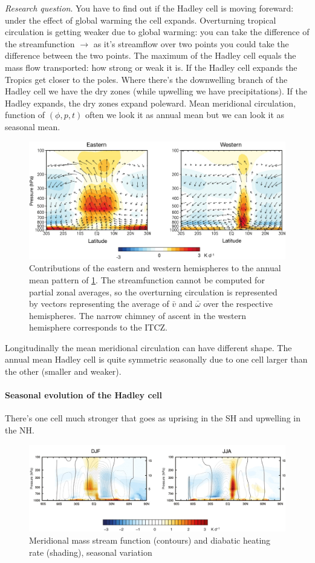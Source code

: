 \textit{Research question}. You have to find out if the Hadley cell is moving foreward: under the effect of global warming the cell expands. Overturning tropical circulation is getting weaker due to global warming: you can take the difference of the streamfunction $\rightarrow$ as it's streamflow over two points you could take the difference between the two points. The maximum of the Hadley cell equals the mass flow transported: how strong or weak it is. If the Hadley cell expands the Tropics get closer to the poles. Where there's the downwelling branch of the Hadley cell we have the dry zones (while upwelling we have precipitations). If the Hadley expands, the dry zones expand poleward. 
Mean meridional circulation, function of $(\phi,p,t)$ often we look it as annual mean but we can look it as seasonal mean. 
\begin{figure}[h]
    \centering
    \includegraphics[width=0.5\linewidth]{uploads/winds.png}
    \caption{Contributions of the eastern and western hemispheres to the annual mean pattern of \ref{fig:mass}. The streamfunction cannot be computed for partial zonal averages, so the overturning circulation is represented by vectors representing the average of $\bar{v}$ and $\bar{\omega}$ over the respective hemispheres. The narrow chimney of ascent in the western hemisphere corresponds to the ITCZ.}
\end{figure}
Longitudinally the mean meridional circulation can have different shape. The annual mean Hadley cell is quite symmetric seasonally due to one cell larger than the other (smaller and weaker). 
\paragraph{Seasonal evolution of the Hadley cell} There's one cell much stronger that goes as uprising in the SH and upwelling in the NH. 
\begin{figure}[h]
    \centering
    \includegraphics[width=0.5\linewidth]{uploads/meridional stream.png}
    \caption{Meridional mass stream function (contours) and diabatic heating rate (shading), seasonal variation}
    \label{fig:mass}
\end{figure}

